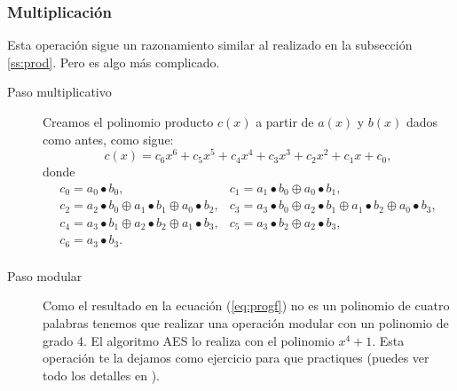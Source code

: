 \subsubsection{Multiplicación}\label{ss:prodraro}
Esta operación sigue un razonamiento similar al realizado en la subsección \ref{ss:prod}. Pero es algo más complicado.
\begin{description}
\item[Paso multiplicativo] Creamos el polinomio producto $c(x)$ a partir de $a(x)$ y $b(x)$ dados como antes, como sigue:
$$
c(x)=c_6x^6+c_5x^5+c_4 x^4+c_3 x^3 +c_2 x^2 +c_1 x+c_0,
$$
donde
\begin{equation}\label{eq:progf}
\begin{array}{ll}
c_0= a_0 \bullet b_0, & c_1=a_1\bullet b_0 \oplus a_0 \bullet b_1,\\
c_2=a_2\bullet b_0 \oplus a_1 \bullet b_1 \oplus a_0 \bullet b_2 , & c_3= a_3\bullet b_0 \oplus a_2 \bullet b_1 \oplus a_1 \bullet b_2 \oplus a_0\bullet b_3,\\
c_4=a_3\bullet b_1 \oplus a_2 \bullet b_2 \oplus a_1 \bullet b_3, &  c_5=a_3\bullet b_2 \oplus a_2 \bullet b_3,\\
c_6=a_3\bullet b_3. & \\
\end{array}
\end{equation}
\item[Paso modular] Como el resultado en la ecuación (\ref{eq:progf}) no es un polinomio de cuatro palabras tenemos que realizar una operación modular con un polinomio de grado 4. El algoritmo AES lo realiza con el polinomio $x^4+1$. Esta operación te la dejamos como ejercicio para que practiques (puedes ver todo los detalles en \cite{Federal}).
\end{description}


